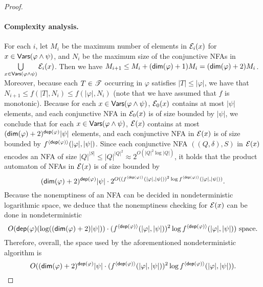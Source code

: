 \begin{proof}
\paragraph{Complexity analysis.} For each $i$, 
let $M_i$ be the maximum number of elements in $\mathcal{E}_i(x)$ for $x  \in \mathsf{Vars}(\varphi \wedge \psi)$,
and $N_i$ be the maximum size of the conjunctive NFAs in $\bigcup \limits_{x \in \mathsf{Vars}(\varphi \wedge \psi)} \mathcal{E}_i(x)$.
Then we have $M_{i+1} \le M_i + (\mathsf{dim}(\varphi)+1)M_i = (\mathsf{dim}(\varphi)+2) M_i$. Moreover,  because each $T \in \mathscr{T}$ occurring in $\varphi$ satisfies   $|T| \le |\varphi|$, we have that $N_{i+1} \le f(|T|, N_i) \le f(|\varphi|, N_i)$ (note that we have assumed that $f$ is monotonic). Because for each $x \in \mathsf{Vars}(\varphi \wedge \psi)$, $\mathcal{E}_0(x)$ contains at most $|\psi|$ elements, and each conjunctive NFA in $\mathcal{E}_0(x)$ is of size bounded by $|\psi|$, we conclude that for each $x \in \mathsf{Vars}(\varphi \wedge \psi)$, $\mathcal{E}(x)$ contains at most $(\mathsf{dim}(\varphi)+2)^{\mathsf{dep}(\varphi)} |\psi|$ elements, and each conjunctive NFA in $\mathcal{E}(x)$ is of size bounded by $f^{\langle \mathsf{dep}(\varphi) \rangle}(|\varphi|, |\psi|)$. 
Since each conjunctive NFA $((Q, \delta), S)$ in $\mathcal{E}(x)$ encodes an NFA of size $|Q|^{|S|} \le |Q|^{|Q|^2} \approx 2^{O(|Q|^2 \log |Q|)}$, 
it holds that the product automaton of NFAs in $\mathcal{E}(x)$ is of size bounded by 
%
$$(\mathsf{dim}(\varphi)+2)^{\mathsf{dep}(\varphi)} |\psi| \cdot 2^{O((f^{\langle \mathsf{dep}(\varphi) \rangle}(|\varphi|, |\psi|))^2 \log f^{\langle \mathsf{dep}(\varphi) \rangle}(|\varphi|, |\psi|) )}.$$
%
Because the nonemptiness of an NFA 
can be decided in nondeterministic logarithmic space, we deduce that the nonemptiness checking for $\mathcal{E}(x)$ can be done in nondeterministic 
$$O(\mathsf{dep}(\varphi) (\log ((\mathsf{dim}(\varphi)+2)|\psi|)) \cdot (f^{\langle \mathsf{dep}(\varphi) \rangle}(|\varphi|, |\psi|))^2 \log f^{\langle \mathsf{dep}(\varphi) \rangle}(|\varphi|, |\psi|)) \mbox{ space.}$$
%
Therefore, overall, the space used by the aforementioned nondeterministic algorithm is 
$$O((\mathsf{dim}(\varphi)+2)^{\mathsf{dep}(\varphi)} |\psi| \cdot  (f^{\langle \mathsf{dep}(\varphi) \rangle}(|\varphi|, |\psi|))^2 \log f^{\langle \mathsf{dep}(\varphi) \rangle}(|\varphi|, |\psi|)).$$ 
\end{proof}
